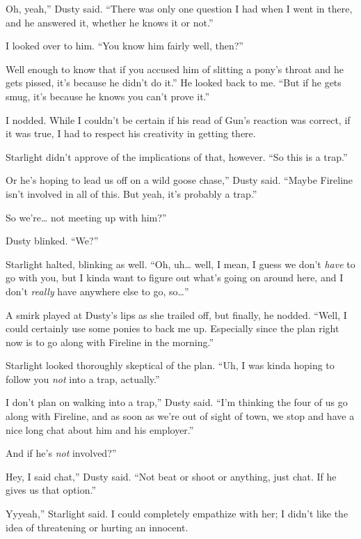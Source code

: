 \leavevmode{}Oh, yeah,” Dusty said. “There was only one question I had when I went in there, and he answered it, whether he knows it or not.”

I looked over to him. “You know him fairly well, then?”

\leavevmode{}Well enough to know that if you accused him of slitting a pony’s throat and he gets pissed, it’s because he didn’t do it.” He looked back to me. “But if he gets smug, it’s because he knows you can’t prove it.”

I nodded. While I couldn’t be certain if his read of Gun’s reaction was correct, if it was true, I had to respect his creativity in getting there.

Starlight didn’t approve of the implications of that, however. “So this is a trap.”

\leavevmode{}Or he’s hoping to lead us off on a wild goose chase,” Dusty said. “Maybe Fireline isn’t involved in all of this. But yeah, it’s probably a trap.”

\leavevmode{}So we’re… not meeting up with him?”

Dusty blinked. “We?”

Starlight halted, blinking as well. “Oh, uh… well, I mean, I guess we don’t \textit{have} to go with you, but I kinda want to figure out what’s going on around here, and I don’t \textit{really} have anywhere else to go, so…”

A smirk played at Dusty’s lips as she trailed off, but finally, he nodded. “Well, I could certainly use some ponies to back me up. Especially since the plan right now is to go along with Fireline in the morning.”

Starlight looked thoroughly skeptical of the plan. “Uh, I was kinda hoping to follow you \textit{not} into a trap, actually.”

\leavevmode{}I don’t plan on walking into a trap,” Dusty said. “I’m thinking the four of us go along with Fireline, and as soon as we’re out of sight of town, we stop and have a nice long chat about him and his employer.”

\leavevmode{}And if he’s \textit{not} involved?”

\leavevmode{}Hey, I said chat,” Dusty said. “Not beat or shoot or anything, just chat. If he gives us that option.”

\leavevmode{}Yyyeah,” Starlight said. I could completely empathize with her; I didn’t like the idea of threatening or hurting an innocent.

